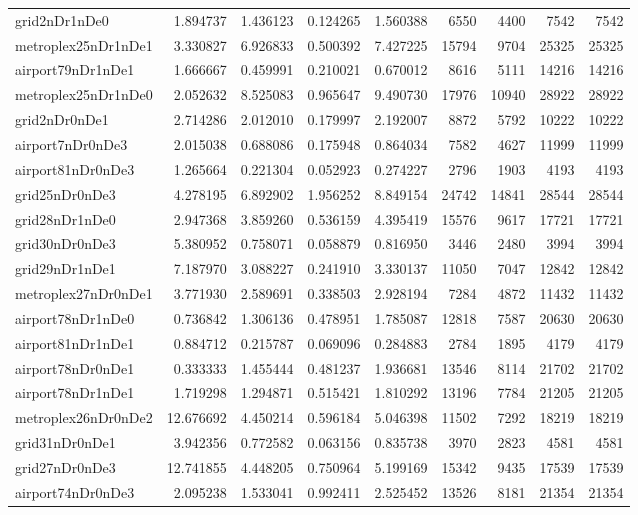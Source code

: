\begin{longtable}{|l|r|r|r|r|r|r|r|r|}
grid2nDr1nDe0 & 1.894737 & 1.436123 & 0.124265 & 1.560388 & 6550 & 4400 & 7542 & 7542 \\
metroplex25nDr1nDe1 & 3.330827 & 6.926833 & 0.500392 & 7.427225 & 15794 & 9704 & 25325 & 25325 \\
airport79nDr1nDe1 & 1.666667 & 0.459991 & 0.210021 & 0.670012 & 8616 & 5111 & 14216 & 14216 \\
metroplex25nDr1nDe0 & 2.052632 & 8.525083 & 0.965647 & 9.490730 & 17976 & 10940 & 28922 & 28922 \\
grid2nDr0nDe1 & 2.714286 & 2.012010 & 0.179997 & 2.192007 & 8872 & 5792 & 10222 & 10222 \\
airport7nDr0nDe3 & 2.015038 & 0.688086 & 0.175948 & 0.864034 & 7582 & 4627 & 11999 & 11999 \\
airport81nDr0nDe3 & 1.265664 & 0.221304 & 0.052923 & 0.274227 & 2796 & 1903 & 4193 & 4193 \\
grid25nDr0nDe3 & 4.278195 & 6.892902 & 1.956252 & 8.849154 & 24742 & 14841 & 28544 & 28544 \\
grid28nDr1nDe0 & 2.947368 & 3.859260 & 0.536159 & 4.395419 & 15576 & 9617 & 17721 & 17721 \\
grid30nDr0nDe3 & 5.380952 & 0.758071 & 0.058879 & 0.816950 & 3446 & 2480 & 3994 & 3994 \\
grid29nDr1nDe1 & 7.187970 & 3.088227 & 0.241910 & 3.330137 & 11050 & 7047 & 12842 & 12842 \\
metroplex27nDr0nDe1 & 3.771930 & 2.589691 & 0.338503 & 2.928194 & 7284 & 4872 & 11432 & 11432 \\
airport78nDr1nDe0 & 0.736842 & 1.306136 & 0.478951 & 1.785087 & 12818 & 7587 & 20630 & 20630 \\
airport81nDr1nDe1 & 0.884712 & 0.215787 & 0.069096 & 0.284883 & 2784 & 1895 & 4179 & 4179 \\
airport78nDr0nDe1 & 0.333333 & 1.455444 & 0.481237 & 1.936681 & 13546 & 8114 & 21702 & 21702 \\
airport78nDr1nDe1 & 1.719298 & 1.294871 & 0.515421 & 1.810292 & 13196 & 7784 & 21205 & 21205 \\
metroplex26nDr0nDe2 & 12.676692 & 4.450214 & 0.596184 & 5.046398 & 11502 & 7292 & 18219 & 18219 \\
grid31nDr0nDe1 & 3.942356 & 0.772582 & 0.063156 & 0.835738 & 3970 & 2823 & 4581 & 4581 \\
grid27nDr0nDe3 & 12.741855 & 4.448205 & 0.750964 & 5.199169 & 15342 & 9435 & 17539 & 17539 \\
airport74nDr0nDe3 & 2.095238 & 1.533041 & 0.992411 & 2.525452 & 13526 & 8181 & 21354 & 21354 \\

\end{longtable}
